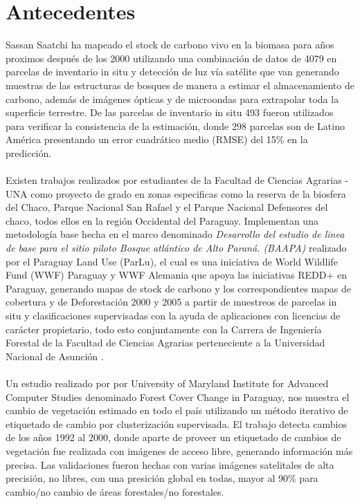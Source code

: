 \section{Antecedentes}
	Sassan Saatchi\cite{saatchi2011benchmark} ha mapeado el stock de carbono vivo en la biomasa para a\~{n}os proximos despu\'es de los 2000 utilizando una combinaci\'on de datos de 4079 en parcelas de inventario in situ y detecci\'on de luz v\'ia sat\'elite que van generando muestras de las estructuras de bosques de manera a estimar el almacenamiento de carbono, adem\'as de im\'agenes \'opticas y de microondas para extrapolar toda la superficie terrestre. De las parcelas de inventario in situ 493 fueron utilizados para verificar la consistencia de la estimaci\'on, donde 298 parcelas son de Latino Am\'erica presentando un error cuadr\'atico medio (RMSE) del 15\% en la predicci\'on.\\~\\
	Existen trabajos realizados por estudiantes de la Facultad de Ciencias Agrarias - UNA como proyecto de grado en zonas especificas como la reserva de la biosfera del Chaco, Parque Nacional San Rafael y el Parque Nacional Defensores del chaco, todos ellos en la regi\'on Occidental del Paraguay. Implementan una metodolog\'ia base hecha en el marco denominado \textit{Desarrollo del estudio de linea de base para el sitio piloto Bosque atl\'antico de Alto Paran\'a. (BAAPA)} realizado por el Paraguay Land Use (ParLu), el cual es una iniciativa de World Wildlife Fund (WWF)	Paraguay y WWF Alemania que apoya las iniciativas REDD+ en Paraguay, generando mapas de stock de carbono y los correspondientes mapas de cobertura y de Deforestaci\'on 2000 y 2005 a partir de muestreos de parcelas in situ y clasificaciones supervisadas con la ayuda de aplicaciones con licencias de car\'acter propietario, todo esto conjuntamente con la  Carrera de Ingenier\'ia Forestal de la Facultad de Ciencias Agrarias perteneciente a la Universidad Nacional de Asunci\'on .\\~\\
	Un estudio realizado por por University of Maryland Institute for Advanced Computer Studies denominado Forest Cover Change in Paraguay, nos muestra el cambio de vegetaci\'on estimado en todo el pa\'is utilizando un m\'etodo iterativo de etiquetado de cambio por clusterizaci\'on supervisada. El trabajo detecta cambios de los a\~{n}os 1992 al 2000, donde aparte de proveer un etiquetado de cambios de vegetaci\'on fue realizada con im\'agenes de acceso libre, generando informaci\'on m\'as precisa. Las validaciones fueron hechas con varias im\'agenes satelitales de alta precisi\'on, no libres, con una presici\'on global  en todas, mayor al 90\% para cambio/no cambio de \'areas forestales/no forestales\cite{huang2009assessment}.

